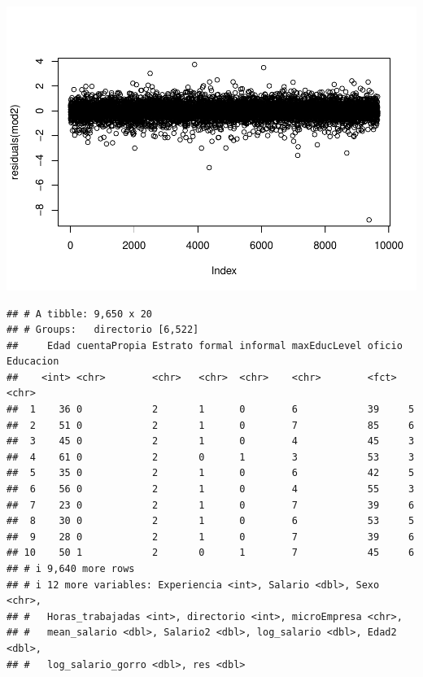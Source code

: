 \documentclass[
]{article}
\newenvironment{Shaded}{\begin{snugshade}}{\end{snugshade}}
\newcommand{\AttributeTok}[1]{\textcolor[rgb]{0.13,0.29,0.53}{#1}}
\newcommand{\DecValTok}[1]{\textcolor[rgb]{0.00,0.00,0.81}{#1}}
\newcommand{\FunctionTok}[1]{\textcolor[rgb]{0.13,0.29,0.53}{\textbf{#1}}}
\newcommand{\NormalTok}[1]{#1}
\newcommand{\OtherTok}[1]{\textcolor[rgb]{0.56,0.35,0.01}{#1}}
\newcommand{\SpecialCharTok}[1]{\textcolor[rgb]{0.81,0.36,0.00}{\textbf{#1}}}
\begin{document}
\includegraphics{Taller-1_files/figure-latex/unnamed-chunk-32-1.pdf}

\begin{Shaded}
\end{Shaded}

\begin{verbatim}
## # A tibble: 9,650 x 20
## # Groups:   directorio [6,522]
##     Edad cuentaPropia Estrato formal informal maxEducLevel oficio Educacion
##    <int> <chr>        <chr>   <chr>  <chr>    <chr>        <fct>  <chr>    
##  1    36 0            2       1      0        6            39     5        
##  2    51 0            2       1      0        7            85     6        
##  3    45 0            2       1      0        4            45     3        
##  4    61 0            2       0      1        3            53     3        
##  5    35 0            2       1      0        6            42     5        
##  6    56 0            2       1      0        4            55     3        
##  7    23 0            2       1      0        7            39     6        
##  8    30 0            2       1      0        6            53     5        
##  9    28 0            2       1      0        7            39     6        
## 10    50 1            2       0      1        7            45     6        
## # i 9,640 more rows
## # i 12 more variables: Experiencia <int>, Salario <dbl>, Sexo <chr>,
## #   Horas_trabajadas <int>, directorio <int>, microEmpresa <chr>,
## #   mean_salario <dbl>, Salario2 <dbl>, log_salario <dbl>, Edad2 <dbl>,
## #   log_salario_gorro <dbl>, res <dbl>
\end{verbatim}
\end{document}
